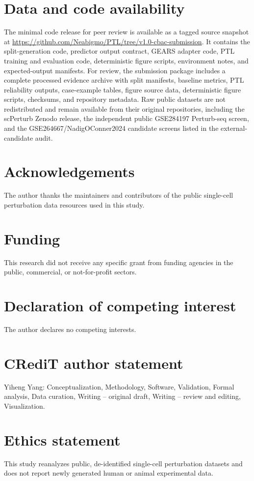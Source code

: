 \documentclass[11pt]{article}
\begin{document}
\section*{Data and code availability}
The minimal code release for peer review is available as a tagged source snapshot at \url{https://github.com/Neabigmo/PTL/tree/v1.0-cbac-submission}. It contains the split-generation code, predictor output contract, GEARS adapter code, PTL training and evaluation code, deterministic figure scripts, environment notes, and expected-output manifests. For review, the submission package includes a complete processed evidence archive with split manifests, baseline metrics, PTL reliability outputs, case-example tables, figure source data, deterministic figure scripts, checksums, and repository metadata. Raw public datasets are not redistributed and remain available from their original repositories, including the scPerturb Zenodo release, the independent public GSE284197 Perturb-seq screen, and the GSE264667/NadigOConner2024 candidate screens listed in the external-candidate audit.

\section*{Acknowledgements}
The author thanks the maintainers and contributors of the public single-cell perturbation data resources used in this study.

\section*{Funding}
This research did not receive any specific grant from funding agencies in the public, commercial, or not-for-profit sectors.

\section*{Declaration of competing interest}
The author declares no competing interests.

\section*{CRediT author statement}
Yiheng Yang: Conceptualization, Methodology, Software, Validation, Formal analysis, Data curation, Writing -- original draft, Writing -- review and editing, Visualization.

\section*{Ethics statement}
This study reanalyzes public, de-identified single-cell perturbation datasets and does not report newly generated human or animal experimental data.
\end{document}
